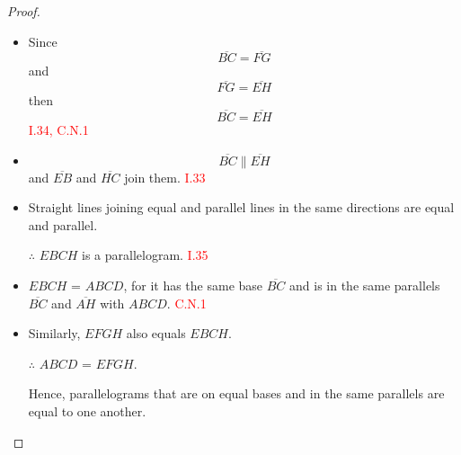 \begin{proof}

\begin{itemize}

\item[]

\item  Since 
\[\overline{BC} = \overline{FG}\] 
and 
\[\overline{FG} = \overline{EH}\]
then 
\[\overline{BC} = \overline{EH}\]\hfill\textcolor{red}{I.34, C.N.1}

\item  \[\overline{BC} \parallel \overline{EH}\] 
and $\overline{EB}$ and $\overline{HC}$ join them. \hfill\textcolor{red}{I.33}

\item  Straight lines joining equal and parallel lines in the same directions are equal and parallel. 

\item[$\therefore$] $EBCH$ is a parallelogram. \hfill\textcolor{red}{I.35}

\item  $EBCH$ = $ABCD$, for it has the same base $\overline{BC}$ and is in the same parallels $\overline{BC}$ and $\overline{AH}$ with $ABCD$. \hfill\textcolor{red}{C.N.1}

\item Similarly, $EFGH$ also equals $EBCH$.

\item[$\therefore$] $ABCD$ = $EFGH$.

Hence, parallelograms that are on equal bases and in the same parallels are equal to one another. 

\end{itemize}

\end{proof}

\clearpage
